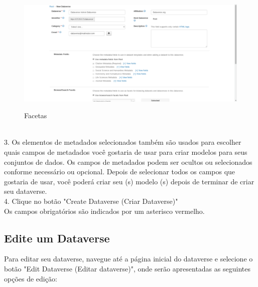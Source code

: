 \documentclass[12pt,hidelinks]{article}
\begin{document}
 \begin{figure}[H]
 \caption{Facetas}
\centering
    \includegraphics[width=1.0\textwidth]{Prints/p4.png}
    \label{print4}
\end{figure}
\\
 
3. Os elementos de metadados selecionados também são usados para escolher quais campos de metadados você gostaria de usar para criar modelos para seus conjuntos de dados. Os campos de metadados podem ser ocultos ou selecionados conforme necessário ou opcional. Depois de selecionar todos os campos que gostaria de usar, você poderá criar seu (s) modelo (s) depois de terminar de criar seu dataverse.\\

4. Clique no botão "Create Dataverse (Criar Dataverse)"\\

Os campos obrigatórios são indicados por um asterisco vermelho.
    
    \subsection{Edite um Dataverse}
    
\qquad Para editar seu dataverse, navegue até a página inicial do dataverse e selecione o botão "Edit Dataverse (Editar dataverse)", onde serão apresentadas as seguintes opções de edição:
\end{document}
